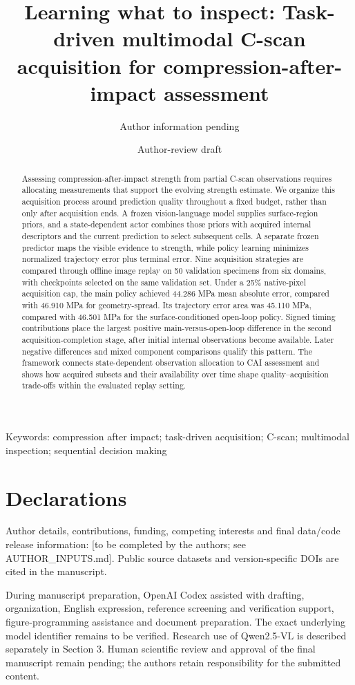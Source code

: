 \documentclass[11pt,a4paper]{article}
\title{Learning what to inspect: Task-driven multimodal C-scan acquisition for compression-after-impact assessment}
\author{Author information pending}
\date{Author-review draft}
\begin{document}
\maketitle
\begin{abstract}
Assessing compression-after-impact strength from partial C-scan observations requires allocating measurements that support the evolving strength estimate. We organize this acquisition process around prediction quality throughout a fixed budget, rather than only after acquisition ends. A frozen vision-language model supplies surface-region priors, and a state-dependent actor combines those priors with acquired internal descriptors and the current prediction to select subsequent cells. A separate frozen predictor maps the visible evidence to strength, while policy learning minimizes normalized trajectory error plus terminal error. Nine acquisition strategies are compared through offline image replay on 50 validation specimens from six domains, with checkpoints selected on the same validation set. Under a 25\% native-pixel acquisition cap, the main policy achieved 44.286 MPa mean absolute error, compared with 46.910 MPa for geometry-spread. Its trajectory error area was 45.110 MPa, compared with 46.501 MPa for the surface-conditioned open-loop policy. Signed timing contributions place the largest positive main-versus-open-loop difference in the second acquisition-completion stage, after initial internal observations become available. Later negative differences and mixed component comparisons qualify this pattern. The framework connects state-dependent observation allocation to CAI assessment and shows how acquired subsets and their availability over time shape quality--acquisition trade-offs within the evaluated replay setting.
\end{abstract}
Keywords: compression after impact; task-driven acquisition; C-scan; multimodal inspection; sequential decision making






\section{Declarations}\label{declarations}

Author details, contributions, funding, competing interests and final data/code release information: {[}to be completed by the authors; see AUTHOR\_INPUTS.md{]}. Public source datasets and version-specific DOIs are cited in the manuscript.

During manuscript preparation, OpenAI Codex assisted with drafting, organization, English expression, reference screening and verification support, figure-programming assistance and document preparation. The exact underlying model identifier remains to be verified. Research use of Qwen2.5-VL is described separately in Section 3. Human scientific review and approval of the final manuscript remain pending; the authors retain responsibility for the submitted content.



\end{document}
